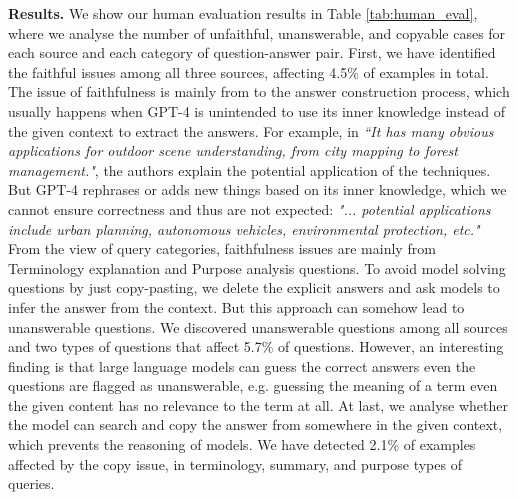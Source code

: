 \documentclass[letterpaper]{article} %
\begin{document}
\begin{table}
    \centering
    \caption{Human evaluation on the faithfulness, answerability, and copyability of LatestEval.}
    \label{tab:human_eval}
\end{table}

\noindent\textbf{Results.} We show our human evaluation results in Table \ref{tab:human_eval}, where we analyse the number of unfaithful, unanswerable, and copyable cases for each source and each category of question-answer pair. First, we have identified the faithful issues among all three sources, affecting 4.5\% of examples in total. The issue of faithfulness is mainly from to the answer construction process, which usually happens when GPT-4 is unintended to use its inner knowledge instead of the given context to extract the answers. For example, in \textit{``It has many obvious applications for outdoor scene understanding, from city mapping to forest management."}, the authors explain the potential application of the techniques. But GPT-4 rephrases or adds new things based on its inner knowledge, which we cannot ensure correctness and thus are not expected: \textit{"... potential applications include urban planning, autonomous vehicles, environmental protection, etc."} From the view of query categories, faithfulness issues are mainly from Terminology explanation and Purpose analysis questions.
To avoid model solving questions by just copy-pasting, we delete the explicit answers and ask models to infer the answer from the context. But this approach can somehow lead to unanswerable questions. We discovered unanswerable questions among all sources and two types of questions that affect 5.7\% of questions. However, an interesting finding is that large language models can guess the correct answers even the questions are flagged as unanswerable, e.g. guessing the meaning of a term even the given content has no relevance to the term at all. At last, we analyse whether the model can search and copy the answer from somewhere in the given context, which prevents the reasoning of models. We have detected 2.1\% of examples affected by the copy issue, in terminology, summary, and purpose types of queries.
\end{document}
